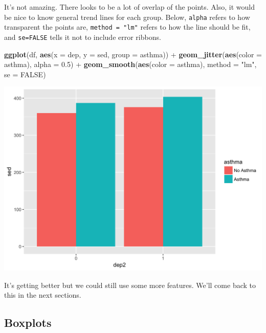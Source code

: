 \documentclass[]{tufte-book}
\newenvironment{Shaded}{}{}
\newcommand{\KeywordTok}[1]{\textcolor[rgb]{0.00,0.44,0.13}{\textbf{#1}}}
\newcommand{\DataTypeTok}[1]{\textcolor[rgb]{0.56,0.13,0.00}{#1}}
\newcommand{\FloatTok}[1]{\textcolor[rgb]{0.25,0.63,0.44}{#1}}
\newcommand{\StringTok}[1]{\textcolor[rgb]{0.25,0.44,0.63}{#1}}
\newcommand{\OtherTok}[1]{\textcolor[rgb]{0.00,0.44,0.13}{#1}}
\newcommand{\OperatorTok}[1]{\textcolor[rgb]{0.40,0.40,0.40}{#1}}
\newcommand{\NormalTok}[1]{#1}
\theoremstyle{definition}
\theoremstyle{definition}
\theoremstyle{remark}
\begin{document}
It's not amazing. There looks to be a lot of overlap of the points.
Also, it would be nice to know general trend lines for each group.
Below, \texttt{alpha} refers to how transparent the points are,
\texttt{method\ =\ "lm"} refers to how the line should be fit, and
\texttt{se=FALSE} tells it not to include error ribbons.

\begin{Shaded}
\begin{Highlighting}[]
\KeywordTok{ggplot}\NormalTok{(df, }\KeywordTok{aes}\NormalTok{(}\DataTypeTok{x =}\NormalTok{ dep, }\DataTypeTok{y =}\NormalTok{ sed, }\DataTypeTok{group =}\NormalTok{ asthma)) }\OperatorTok{+}\StringTok{ }
\StringTok{    }\KeywordTok{geom_jitter}\NormalTok{(}\KeywordTok{aes}\NormalTok{(}\DataTypeTok{color =}\NormalTok{ asthma), }\DataTypeTok{alpha =} \FloatTok{0.5}\NormalTok{) }\OperatorTok{+}\StringTok{ }
\StringTok{    }\KeywordTok{geom_smooth}\NormalTok{(}\KeywordTok{aes}\NormalTok{(}\DataTypeTok{color =}\NormalTok{ asthma), }\DataTypeTok{method =} \StringTok{"lm"}\NormalTok{, }
        \DataTypeTok{se =} \OtherTok{FALSE}\NormalTok{)}
\end{Highlighting}
\end{Shaded}

\includegraphics{_main_files/figure-latex/unnamed-chunk-140-1}

It's getting better but we could still use some more features. We'll
come back to this in the next sections.

\subsection*{Boxplots}\label{boxplots}
\end{document}
